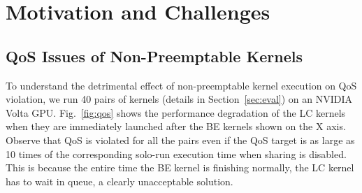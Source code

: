 
\section{Motivation and Challenges}
\label{sec:motiv}
\vspace{-.2cm}	
	
\subsection{QoS Issues of Non-Preemptable Kernels}
\label{sec:non-preemptable}
To understand the detrimental effect of non-preemptable kernel execution on QoS violation, we run 40 pairs of kernels (details in Section~\ref{sec:eval}) on an NVIDIA Volta GPU. Fig.~\ref{fig:qos} shows the performance degradation of the LC kernels when they are immediately launched after the BE kernels shown on the X axis.  Observe that QoS is violated for all the pairs even if the QoS target is as large as 10 times of the corresponding solo-run execution time when sharing is disabled. This is because the entire time the BE kernel is finishing normally, the LC kernel has to wait in queue, a clearly unacceptable solution.
% 
	
